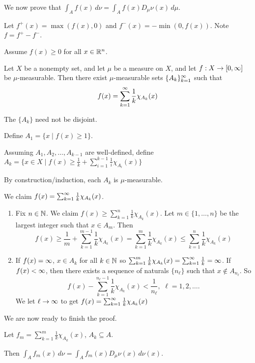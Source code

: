 \documentclass[x11names,reqno,14pt]{extarticle}
\newcommand{\seq}[2][\oo]{_{#2 = 1}^#1}
\newcommand{\Dmn}{D_\mu\nu}
\begin{document}
We now prove that $\int_Af(x)\,d\nu = \int_Af(x)\Dmn(x)\,d\mu$. 

Let $f^+(x) = \max(f(x), 0)$ and $f^-(x) = -\min(0, f(x))$. Note $f = f^+ - f^-$. 

Assume $f(x) \geq 0$ for all $x \in\mathbb{R}^n$. 

\lem 

Let $X$ be a nonempty set, and let $\mu$ be a measure on $X$, and let $f:X\to[0,\infty]$ be $\mu$-measurable. Then there exist $\mu$-measurable sets $\{A_k\}\seq{k}$ such that 
\[
f(x) = \sum_{k=1}^\infty \frac{1}{k}\chi_{A_k}(x)
\]

\rem The $\{A_k\}$ need not be disjoint.

\proof 

Define $A_1 = \{x\mid f(x)\geq1\}$. 

Assuming $A_1, A_2, \dots, A_{k - 1}$ are well-defined, define $A_k = \{x\in X \mid f(x) \geq \frac{1}{k} + \sum_{i=1}^{k - 1}\frac{1}{i}\chi_{A_i}(x)\}$

By construction/induction, each $A_k$ is $\mu$-measurable. 

We claim $f(x) = \sum_{k=1}^\infty\frac{1}{k}\chi_{A_k}(x)$. 

\begin{enumerate}

\item Fix $n\in\mathbb{N}$. We claim $f(x) \geq \sum_{k=1}^n\frac{1}{k}\chi_{A_k}(x)$. Let $m\in\{1,\dots,n\}$ be the largest integer such that $x \in A_m$. Then 
\[
f(x) \geq \frac{1}{m} + \sum_{k=1}^{m - 1}\frac{1}{k}\chi_{A_k}(x) = \sum_{k=1}^m\frac{1}{k}\chi_{A_k}(x) \leq \sum_{k=1}^n\frac{1}{k}\chi_{A_k}(x)
\]

\item If $f(x) = \infty$, $x \in A_k$ for all $k\in\mathbb{N}$ so $\sum_{k=1}^m\frac{1}{k}\chi_{A_k}(x) = \sum_{k=1}^\infty\frac{1}{k} = \infty$. If $f(x) < \infty$, then there exists a sequence of naturals $\{n_\ell\}$ such that $x\not\in A_{n_\ell}$. So 
\[
f(x) - \sum_{k=1}^{n_\ell - 1}\frac{1}{k}\chi_{A_k}(x) < \frac{1}{n_\ell}, \,\,\ell = 1, 2, \dots .
\]
We let $\ell\to\infty$ to get $f(x) = \sum_{k=1}^{\infty}\frac{1}{k}\chi_{A_k}(x)$

\end{enumerate}

We are now ready to finish the proof. 

Let $f_m = \sum_{k=1}^{m}\frac{1}{k}\chi_{A_k}(x)$, $A_k \subseteq A$. 

Then $\int_Af_m(x)\,d\nu = \int_Af_m(x)\Dmn(x)\,d\nu(x)$. 
\end{document}
